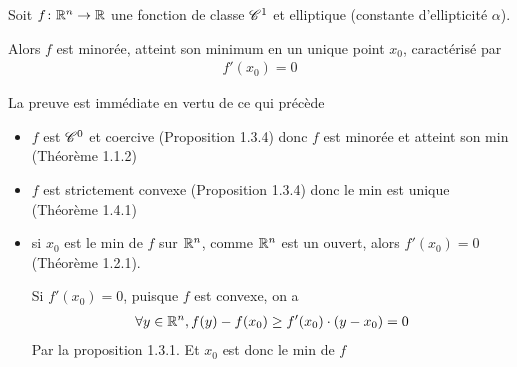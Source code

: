 \documentclass[french,a4paper,10pt]{article}
\begin{document}
	\begin{oc-proposition}
		Soit $f\colon\mathbb{R}^n\to\mathbb{R}$ une fonction de classe $\mathscr{C}^1$ et elliptique (constante d'ellipticité $\alpha$).
		
		Alors $f$ est minorée, atteint son minimum en un unique point $x_0$, caractérisé par
			\[\begin{aligned}
				f'(x_0)=0
			\end{aligned}\]
	\end{oc-proposition}
	
	\begin{myproof}
		La preuve est immédiate en vertu de ce qui précède
		\begin{itemize}
			\item $f$ est $\mathscr{C}^0$ et coercive (Proposition 1.3.4) donc $f$ est minorée et atteint son min (Théorème 1.1.2)
			
			\item $f$ est strictement convexe (Proposition 1.3.4) donc le min est unique (Théorème 1.4.1)
			
			\item si $x_0$ est le min de $f$ sur $\mathbb{R}^n$, comme $\mathbb{R}^n$ est un ouvert, alors $f'(x_0)=0$ (Théorème 1.2.1).
			
			Si $f'(x_0)=0$, puisque $f$ est convexe, on a
				\[\begin{aligned}
					\forall y\in\mathbb{R}^n,f(y)-f(x_0)\ge f'(x_0)\cdot(y-x_0)=0
				\end{aligned}\]
			Par la proposition 1.3.1. Et $x_0$ est donc le min de $f$
		\end{itemize}
	\end{myproof}
\end{document}
